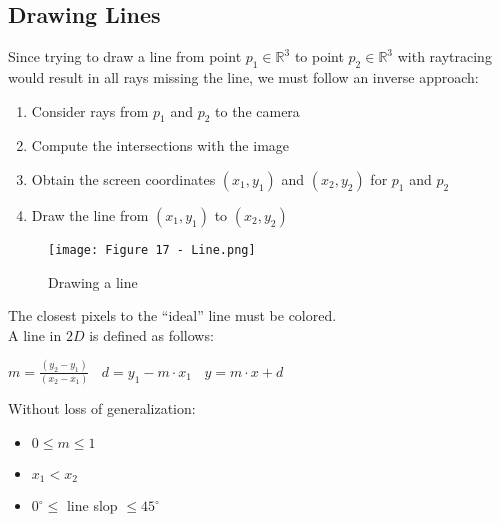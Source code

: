 \documentclass{article}
\begin{document}
\subsection{Drawing Lines}
Since trying to draw a line from point $p_1 \in \mathbb{R}^3$ to point $p_2 \in \mathbb{R}^3$ with raytracing would result in all rays missing the line, we must follow an inverse approach:
\begin{enumerate}
    \item Consider rays from $p_1$ and $p_2$ to the camera
    \item Compute the intersections with the image
    \item Obtain the screen coordinates $(x_1, y_1)$ and $(x_2, y_2)$ for $p_1$ and $p_2$
    \item Draw the line from $(x_1, y_1)$ to $(x_2, y_2)$
\end{enumerate}
\begin{figure}[H]
    \centering
    \texttt{[image: Figure 17 - Line.png]}
    \caption{Drawing a line}
\end{figure}
The closest pixels to the “ideal” line must be colored. \\
A line in $2D$ is defined as follows:
\begin{center}
    $m = \displaystyle\frac{(y_2 - y_1)}{(x_2 - x_1)} \ \ \ \ d = y_1 - m \cdot x_1 \ \ \ \     y = m \cdot x + d $
\end{center}
Without loss of generalization:
\begin{itemize}
    \item $ 0 \leq m \leq 1$
    \item $x_1 < x_2$
    \item $0^\circ \leq$ line slop $\leq 45^\circ$
\end{itemize}
\newpage
\end{document}
